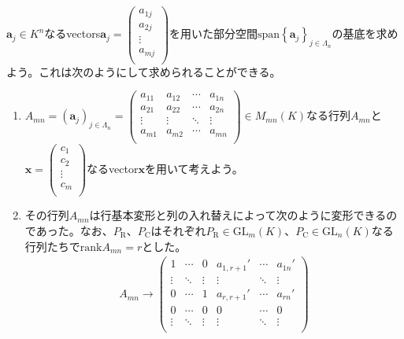\documentclass[dvipdfmx]{jsarticle}
\begin{document}
\begin{thm*}
    $\mathbf{a}_{j} \in K^{n}$なるvectors$\mathbf{a}_{j} = \begin{pmatrix}
    a_{1j} \\
    a_{2j} \\
     \vdots \\
    a_{mj} \\
    \end{pmatrix}$を用いた部分空間${\mathrm{span} }\left\{ \mathbf{a}_{j} \right\}_{j \in \varLambda_{n}}$の基底を求めよう。これは次のようにして求められることができる。
    \begin{enumerate}
    \item
      $A_{mn} = \left( \mathbf{a}_{j} \right)_{j \in \varLambda_{n}} = \begin{pmatrix}
      a_{11} & a_{12} & \cdots & a_{1n} \\
      a_{21} & a_{22} & \cdots & a_{2n} \\
       \vdots & \vdots & \ddots & \vdots \\
      a_{m1} & a_{m2} & \cdots & a_{mn} \\
      \end{pmatrix} \in M_{mn}(K)$なる行列$A_{mn}$と$\mathbf{x} = \begin{pmatrix}
      c_{1} \\
      c_{2} \\
       \vdots \\
      c_{m} \\
      \end{pmatrix}$なるvector$\mathbf{x}$を用いて考えよう。
    \item
      その行列$A_{mn}$は行基本変形と列の入れ替えによって次のように変形できるのであった。なお、$P_{\mathrm{R}}$、$P_{\mathrm{C}}$はそれぞれ$P_{\mathrm{R}} \in {\mathrm{GL}}_{m}(K)$、$P_{\mathrm{C}} \in {\mathrm{GL}}_{n}(K)$なる行列たちで${\mathrm{rank}}A_{mn} = r$とした。
    \begin{align*}
    A_{mn} \rightarrow \begin{pmatrix}
    1 & \cdots & 0 & a_{1,r + 1}' & \cdots & a_{1n}' \\
     \vdots & \ddots & \vdots & \vdots & \ddots & \vdots \\
    0 & \cdots & 1 & a_{r,r + 1}' & \cdots & a_{rn}' \\
    0 & \cdots & 0 & 0 & \cdots & 0 \\
     \vdots & \ddots & \vdots & \vdots & \ddots & \vdots \\

\end{pmatrix}
\end{align*}
\end{enumerate}
\end{thm*}
\end{document}
